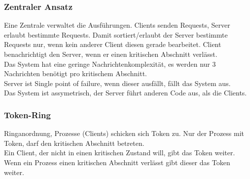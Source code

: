 \documentclass[a4paper]{article}
\begin{document}
\subsubsection{Zentraler Ansatz}
Eine Zentrale verwaltet die Ausführungen. Clients senden Requests, Server erlaubt bestimmte Requests.
Damit sortiert/erlaubt der Server bestimmte Requests nur, wenn kein anderer Client diesen gerade bearbeitet.
Client benachrichtigt den Server, wenn er einen kritischen Abschnitt verlässt.\\
Das System hat eine geringe Nachrichtenkomplexität, es werden nur 3 Nachrichten benötigt pro kritischem Abschnitt.\\
Server ist Single point of failure, wenn dieser ausfällt, fällt das System aus.\\
Das System ist assymetrisch, der Server führt anderen Code aus, als die Clients.
\subsubsection{Token-Ring}
Ringanordnung, Prozesse (Clients) schicken sich Token zu. Nur der Prozess mit Token, darf den kritischen Abschnitt betreten.\\
Ein Client, der nicht in einen kritischen Zustand will, gibt das Token weiter. Wenn ein Prozess einen kritischen Abschnitt verlässt gibt dieser das Token weiter.
\end{document}
